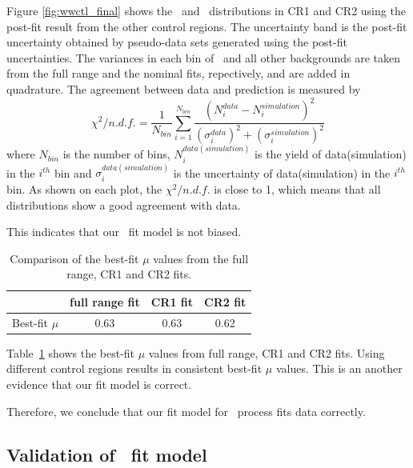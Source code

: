 Figure \ref{fig:wwctl_final} shows the \mT\ and \mll\ distributions in CR1 and CR2 using 
the post-fit result from the other control regions. 
The uncertainty band is the post-fit uncertainty obtained by pseudo-data sets 
generated using the post-fit uncertainties. 
The variances in each bin of \qqww\ and all other backgrounds 
are taken from the full range and the nominal fits, repectively, 
and are added in quadrature. 
The agreement between data and prediction is measured by
\begin{equation} 
\chi^2/n.d.f.
= \frac{1}{N_{bin}} \displaystyle \sum_{i=1}^{N_{bin}}  
  \frac{\left( N^{data}_i - N^{simulation}_i \right)^2}
       {\left( \sigma^{data}_i \right)^2 + \left( \sigma^{simulation}_i \right)^2}   
\end{equation}  
where $N_{bin}$ is the number of bins, 
$N^{data(simulation)}_i$ is the yield of data(simulation) in the $i^{th}$ bin
and $\sigma^{data(simulation)}_i$ is the uncertainty of data(simulation) 
in the $i^{th}$ bin. As shown on each plot, the $\chi^2/n.d.f.$
is close to 1, which means that all distributions show a good agreement with data.

This indicates that our \qqww\ fit model is not biased.
%
\begin{table}
\begin{center}
\begin{tabular}{c|ccc}
\hline
                    & full range fit    & CR1 fit   & CR2 fit   \\
\hline \hline
Best-fit $\mu$      & 0.63              & 0.63      & 0.62      \\
\hline
\end{tabular}
\end{center}
\caption{Comparison of the best-fit $\mu$ values from the full range, CR1 and CR2 fits.} 
\label{tab:bestfitmu_compare}
\end{table}

Table~\ref{tab:bestfitmu_compare} shows the best-fit $\mu$ values from full range, 
CR1 and CR2 fits. Using different control regions results in consistent 
best-fit $\mu$ values. 
This is an another evidence that our fit model is correct. 

Therefore, we conclude that our fit model for \qqww\ process fits data correctly.  

\subsection{Validation of \topbkg\ fit model} 

